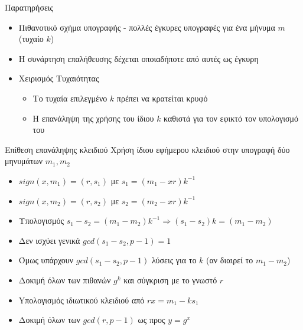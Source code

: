 \documentclass[handout]{beamer}
\begin{document}
\begin{frame}{Παρατηρήσεις}
\begin{itemize}
\item Πιθανοτικό σχήμα υπογραφής - πολλές έγκυρες υπογραφές για ένα μήνυμα $m$ (τυχαίο $k$)
\pause
\item Η συνάρτηση επαλήθευσης δέχεται οποιαδήποτε από αυτές ως έγκυρη
\pause
\item Χειρισμός Τυχαιότητας
\begin{itemize}
\item Το τυχαία επιλεγμένο $k$ πρέπει να κρατείται κρυφό
\item H επανάληψη της χρήσης του ίδιου $k$ καθιστά για τον \adv εφικτό τον υπολογισμό του  
\end{itemize}
\end{itemize}
\end{frame}

\begin{frame}{Επίθεση επανάληψης κλειδιού}
Χρήση ίδιου εφήμερου κλειδιού στην υπογραφή δύο μηνυμάτων $m_1,m_2$
\begin{itemize}
    \item $sign(x,m_1) = (r,s_1)$ με $s_1 = (m_1 - x r) k^{-1} $ \pause 
    \item $sign(x,m_2) = (r,s_2)$ με $s_2 = (m_2 - x r) k^{-1} $ \pause
    \item Υπολογισμός $s_1 - s_2 = (m_1 - m_2) k^{-1} \Rightarrow (s_1-s_2)k = (m_1-m_2)$ \pause 
    \item Δεν ισχύει γενικά $gcd(s_1 - s_2, p-1) = 1$ \pause
    \item Όμως υπάρχουν $gcd(s_1 - s_2,p-1)$ λύσεις για το $k$ (αν διαιρεί το $m_1 - m_2$)
    \item Δοκιμή όλων των πιθανών $g^k$ και σύγκριση με το γνωστό $r$ \pause
    \item Yπολογισμός ιδιωτικού κλειδιού από $rx = m_1 - ks_1$ \pause
    \item Δοκιμή όλων των $gcd(r,p-1)$ ως προς $y=g^x$ 
\end{itemize}
\end{frame}
\end{document}

